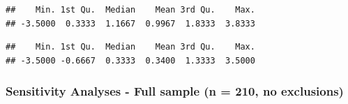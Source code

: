 \documentclass[
]{article}
\newenvironment{Shaded}{\begin{snugshade}}{\end{snugshade}}
\newcommand{\FunctionTok}[1]{\textcolor[rgb]{0.13,0.29,0.53}{\textbf{#1}}}
\newcommand{\NormalTok}[1]{#1}
\newcommand{\SpecialCharTok}[1]{\textcolor[rgb]{0.81,0.36,0.00}{\textbf{#1}}}
\begin{document}
\begin{verbatim}
##    Min. 1st Qu.  Median    Mean 3rd Qu.    Max. 
## -3.5000  0.3333  1.1667  0.9967  1.8333  3.8333
\end{verbatim}

\begin{Shaded}
\end{Shaded}

\begin{verbatim}
##    Min. 1st Qu.  Median    Mean 3rd Qu.    Max. 
## -3.5000 -0.6667  0.3333  0.3400  1.3333  3.5000
\end{verbatim}

\subsubsection{Sensitivity Analyses - Full sample (n = 210, no
exclusions)}\label{sensitivity-analyses---full-sample-n-210-no-exclusions}
\end{document}
